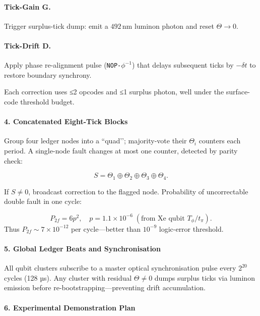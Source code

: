 \documentclass[11pt,oneside]{book}
\begin{document}
\paragraph{Tick-Gain \(\mathbf{G}\).}
Trigger surplus-tick dump:
emit a $492\,$nm luminon photon and reset \(\Theta\rightarrow0\).

\paragraph{Tick-Drift \(\mathbf{D}\).}
Apply phase re-alignment pulse (\texttt{NOP-\(\phi^{-1}\)}) that delays
subsequent ticks by \(-\delta t\) to restore boundary synchrony.

Each correction uses ≤2 opcodes and ≤1 surplus photon, well under the
surface-code threshold budget.

\paragraph*{4. Concatenated Eight-Tick Blocks}

Group four ledger nodes into a “quad’’; majority-vote their
\(\Theta_i\) counters each period.
A single-node fault changes at most one counter, detected by parity
check:

\[
   S = \Theta_1 \oplus \Theta_2 \oplus \Theta_3 \oplus \Theta_4.
\]

If \(S\neq0\), broadcast correction to the flagged node.
Probability of uncorrectable double fault in one cycle:

\[
   P_{2f} = 6p^2,
   \quad p = 1.1\times10^{-6}\;
            (\text{from Xe qubit } T_\phi/t_\pi).
\]
Thus \(P_{2f}\sim7\times10^{-12}\) per cycle—better than
\(10^{-9}\) logic-error threshold.

\paragraph*{5. Global Ledger Beats and Synchronisation}

All qubit clusters subscribe to a master optical synchronisation
pulse every \(2^{20}\) cycles (128 µs).  
Any cluster with residual \(\Theta\neq0\) dumps surplus ticks via
luminon emission before re-bootstrapping—preventing drift accumulation.

\paragraph*{6. Experimental Demonstration Plan}
\end{document}
